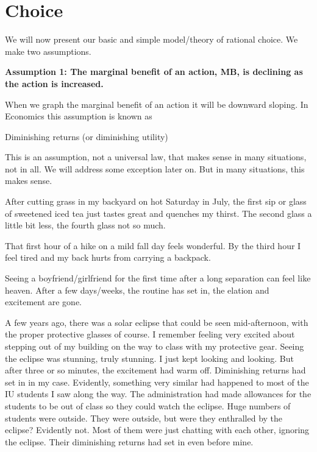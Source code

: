\documentclass[
]{book}
\begin{document}
\hypertarget{choice}{%
\section{Choice}\label{choice}}

We will now present our basic and simple model/theory of rational choice. We make two assumptions.

\begin{center}
\textbf{Assumption 1: The marginal benefit of an action, MB, is declining as the action is increased.}

\end{center}

When we graph the marginal benefit of an action it will be downward sloping. In Economics this assumption is known as

\begin{center}
Diminishing returns (or diminishing utility)

\end{center}

This is an assumption, not a universal law, that makes sense in many situations, not in all. We will address some exception later on. But in many situations, this makes sense.

After cutting grass in my backyard on hot Saturday in July, the first sip or glass of sweetened iced tea just tastes great and quenches my thirst. The second glass a little bit less, the fourth glass not so much.

That first hour of a hike on a mild fall day feels wonderful. By the third hour I feel tired and my back hurts from carrying a backpack.

Seeing a boyfriend/girlfriend for the first time after a long separation can feel like heaven. After a few days/weeks, the routine has set in, the elation and excitement are gone.

A few years ago, there was a solar eclipse that could be seen mid-afternoon, with the proper protective glasses of course. I remember feeling very excited about stepping out of my building on the way to class with my protective gear. Seeing the eclipse was stunning, truly stunning. I just kept looking and looking. But after three or so minutes, the excitement had warm off. Diminishing returns had set in in my case. Evidently, something very similar had happened to most of the IU students I saw along the way. The administration had made allowances for the students to be out of class so they could watch the eclipse. Huge numbers of students were outside. They were outside, but were they enthralled by the eclipse? Evidently not. Most of them were just chatting with each other, ignoring the eclipse. Their diminishing returns had set in even before mine.
\end{document}
